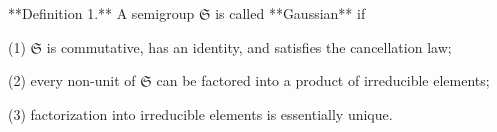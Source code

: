 **Definition 1.** A semigroup $\mathfrak{S}$ is called **Gaussian** if

(1) $\mathfrak{S}$ is commutative, has an identity, and satisfies the cancellation law;

(2) every non-unit of $\mathfrak{S}$ can be factored into a product of irreducible elements;

(3) factorization into irreducible elements is essentially unique.
